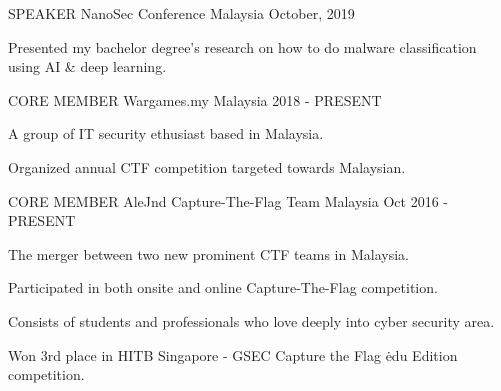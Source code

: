 

\begin{cventries}

    
    \cventry
    {SPEAKER}
    {NanoSec Conference}
    {Malaysia}
    {October, 2019}
    {
      \begin{cvitems}
        \item {Presented my bachelor degree's research on how to do malware classification using AI \& deep learning.}
      \end{cvitems}
    }

    \cventry
    {CORE MEMBER}
    {Wargames.my}
    {Malaysia}
    {2018 - PRESENT}
    {
      \begin{cvitems}
        \item {A group of IT security ethusiast based in Malaysia.}
        \item {Organized annual CTF competition targeted towards Malaysian.}
      \end{cvitems}
    }

    \cventry
    {CORE MEMBER}
    {AleJnd Capture-The-Flag Team}
    {Malaysia}
    {Oct 2016 - PRESENT}
    {
      \begin{cvitems}
        \item {The merger between two new prominent CTF teams in Malaysia.}
        \item {Participated in both onsite and online Capture-The-Flag competition.}
        \item {Consists of students and professionals who love deeply into cyber security area.}
        \item {Won 3rd place in HITB Singapore - GSEC Capture the Flag \.edu Edition competition.}
      \end{cvitems}
    }

\end{cventries}
